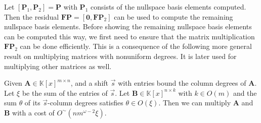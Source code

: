 Let $\left[\mathbf{P}_{1},\mathbf{P}_{2}\right]=\mathbf{P}$ with
$\mathbf{P}_{1}$ consists of the nullspace basis elements computed.
Then the residual $\mathbf{F}\mathbf{P}=\left[\mathbf{0},\mathbf{F}\mathbf{P}_{2}\right]$
can be used to compute the remaining nullspace basis elements. Before
showing the remaining nullspace basis elements can be computed this
way, we first need to ensure that the matrix multiplication $\mathbf{F}\mathbf{P}_{2}$
can be done efficiently. This is a consequence of the following more
general result on multiplying matrices with nonuniform degrees. It
is later used for multiplying other matrices as well.
\begin{lem}
\label{lem:multiplyUnbalancedMatrices}Given $\mathbf{A}\in\mathbb{K}\left[x\right]^{m\times n}$,
and a shift $\vec{s}$ with entries bound the column degrees of $\mathbf{A}$.
Let $\xi$ be the sum of the entries of $\vec{s}$. Let $\mathbf{B}\in\mathbb{K}\left[x\right]^{n\times k}$
with $k\in O\left(m\right)$ and the sum $\theta$ of its $\vec{s}$-column
degrees satisfies $\theta\in O\left(\xi\right)$. Then we can multiply
$\mathbf{A}$ and $\mathbf{B}$ with a cost of $O^{\sim}(nm^{\omega-2}\xi)$. \end{lem}
